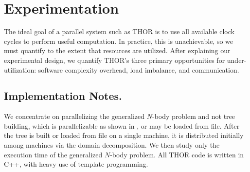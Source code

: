 \documentclass[twoside,leqno,twocolumn]{article}
\newcommand{\authornote}[1]{(\footnote{Note to self: #1})}
\newcommand{\authorsnote}[1]{\authornote{#1}}
\newcommand{\mysub}[1]{\subsection{#1.}}
\begin{document}





\section{Experimentation}


The ideal goal of a parallel system such as THOR is to use all available clock cycles to perform useful computation.
In practice, this is unachievable, so we must quantify to the extent that resources are utilized.
After explaining our experimental design, we quantify THOR's three primary opportunities for under-utilization: software complexity overhead, load imbalance, and communication.

\mysub{Implementation Notes}

We concentrate on parallelizing the generalized $N$-body problem and not tree building, which is parallelizable as shown in \cite{alfuraih00parallel}, or may be loaded from file.
After the tree is built or loaded from file on a single machine, it is distributed initially among machines via the domain decomposition.
We then study only the execution time of the generalized $N$-body problem.%
All THOR code is written in C++, with heavy use of template programming.
\end{document}
